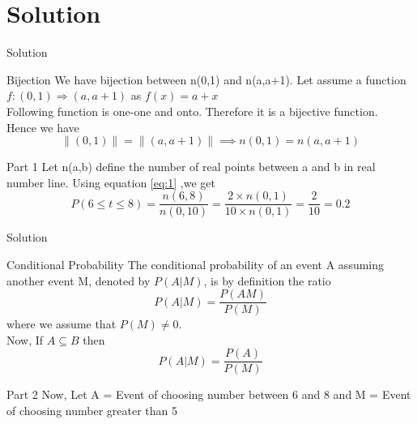 \documentclass{beamer}
\begin{document}
\section{Solution}
\begin{frame}{Solution}
    \begin{alertblock}{Bijection}
        We have bijection between n(0,1) and n(a,a+1). Let assume a function $f:(0,1) \Rightarrow (a,a+1)$ as $f(x) = a+x$ \\
        Following function is one-one and onto. Therefore it is a bijective function.\\
        Hence we have 
        \begin{equation}
            \| (0,1) \| = \| (a,a+1) \| \implies n(0,1) = n(a,a+1) \label{eq:1}
        \end{equation}
    \end{alertblock}
   \begin{block}{Part 1}
    Let n(a,b) define the number of real points between a and b in real number line.
    Using equation \eqref{eq:1} ,we get
        \begin{equation}
            P(6 \leq t \leq 8) = \frac{n(6,8)}{n(0,10)} = \frac{2\times n(0,1)}{10 \times n(0,1)} = \frac{2}{10} = 0.2 \label{eq:2}
        \end{equation}
   \end{block}

\end{frame} 
\begin{frame}{Solution}
    \begin{alertblock}{Conditional Probability}
        The conditional probability of an event A assuming another event M, denoted by $P(A|M)$, is by definition the ratio
        \begin{equation}
            P(A|M) = \frac{P(AM)}{P(M)} \label{eq:3}
        \end{equation}
        where we assume that $P(M) \neq 0$.\\
        Now, If  $A \subseteq B$ then
        \begin{equation}
            P(A|M) = \frac{P(A)}{P(M)} \label{eq:4}
        \end{equation}
    \end{alertblock}
    \begin{block}{Part 2}
        Now, Let A = Event of choosing number between 6 and 8 and M = Event of choosing number greater than 5
    \end{block}
\end{frame}
\end{document}
